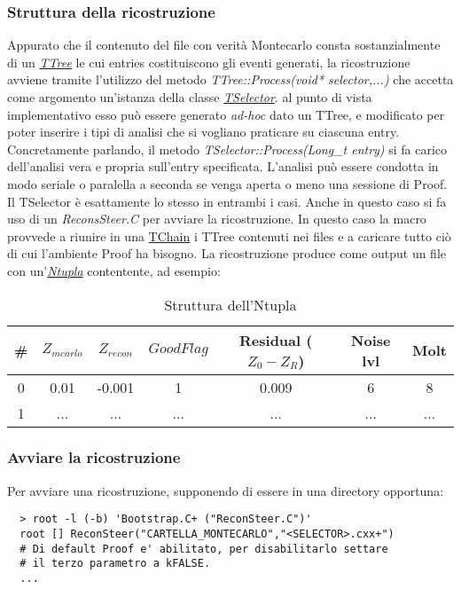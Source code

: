 \documentclass{article}
\begin{document}
\subsubsection{Struttura della ricostruzione}
Appurato che il contenuto del file con verità Montecarlo consta sostanzialmente di un
\textit{\href{http://root.cern.ch/root/html/TTree.html}{TTree}} 
le cui entries costituiscono gli eventi generati, la ricostruzione avviene tramite l'utilizzo del metodo \textit{TTree::Process(void* selector,...)} che accetta come argomento un'istanza della classe \textit{\href{http://root.cern.ch/root/html/TSelector.html}{TSelector}}.
al punto di vista implementativo esso può essere generato \textit{ad-hoc} dato un TTree, e modificato per poter inserire i tipi di analisi che si vogliano praticare su ciascuna entry.
Concretamente parlando, il metodo \textit{TSelector::Process(Long\_t entry)} si fa carico dell'analisi vera e propria sull'entry specificata.
L'analisi può essere condotta in modo seriale o paralella a seconda se venga aperta o meno una sessione di Proof. Il TSelector è esattamente lo stesso in entrambi i casi.
Anche in questo caso si fa uso di un \textit{ReconsSteer.C} per avviare la ricostruzione. In questo caso la macro provvede a riunire in una \href{http://root.cern.ch/root/html/TChain.html}{TChain} i TTree contenuti nei files e a caricare tutto ciò di cui l'ambiente Proof ha bisogno.
La ricostruzione produce come output un file con un'\textit{\href{http://root.cern.ch/root/html/TNtuple.html}{Ntupla}} contentente, ad esempio:\\
\begin{table}[h]
   \begin{tabular}{ c || c | c | c | c | c | c }
      \hline
      \# & $Z_{mcarlo}$ & $Z_{recon}$ & $GoodFlag$ & Residual ($Z_0-Z_R$) & Noise lvl & Molt\\
      \hline
      0 & 0.01 & -0.001 & 1 & 0.009 & 6 & 8 \\
      \hline
      1 & ... & ... & ... & ... & ... & ... \\ 
      \hline 
   \end{tabular}
   \caption{Struttura dell'Ntupla}
\end{table}
\subsubsection{Avviare la ricostruzione}
\noindent Per avviare una ricostruzione, supponendo di essere in una directory opportuna:
\begin{verbatim}
  > root -l (-b) 'Bootstrap.C+ ("ReconSteer.C")'
  root [] ReconSteer("CARTELLA_MONTECARLO","<SELECTOR>.cxx+")
  # Di default Proof e' abilitato, per disabilitarlo settare 
  # il terzo parametro a kFALSE.
  ...
\end{verbatim}
\newpage
\end{document}
